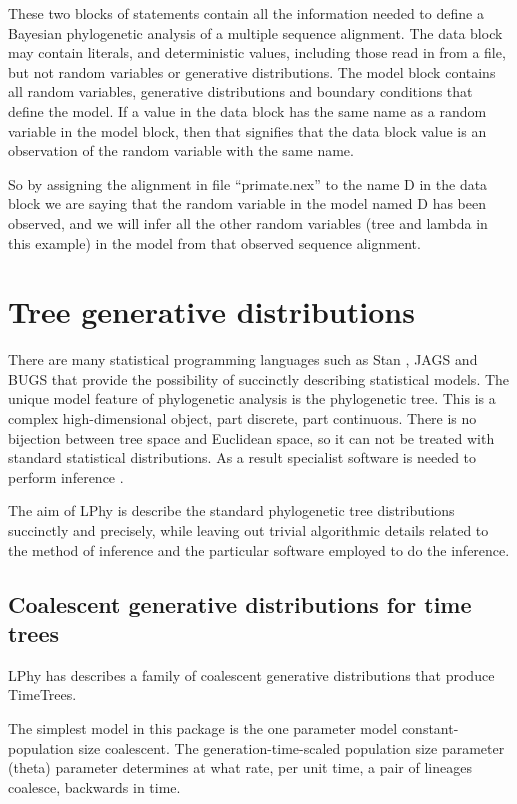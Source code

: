 \documentclass[oneside]{article}
\begin{document}
These two blocks of statements contain all the information needed to define
a Bayesian phylogenetic analysis of a multiple sequence alignment. 
The data block may contain literals, and deterministic values, including those read in from a file, but not random variables or generative distributions.
The model block contains all random variables, generative distributions and boundary conditions that define the model.
If a value in the data block has the same name as a random variable in the model block, then that signifies that the data block value is an observation of the random variable with the same name.


So by assigning the alignment in file
``primate.nex'' to the name D in the data block we are saying that the random variable in the model named D has 
been observed, and we will infer all the other random variables 
(tree and lambda in this example) in the model from that observed sequence alignment.

\section{Tree generative distributions}

There are many statistical programming languages such as Stan
\cite{carpenter2017stan}, JAGS \cite{plummer2003jags} and BUGS \cite{lunn2009bugs, gilks1994language} that provide the possibility
of succinctly describing statistical models. The unique model feature of
phylogenetic analysis is the phylogenetic tree.
This is a complex high-dimensional object, part discrete, part
continuous.
There is no bijection between tree space and Euclidean space, so it
can not be treated with standard statistical distributions.
As a result specialist software is needed to perform inference \cite{hohna2016revbayes,bouckaert2019beastanalysis}.

The aim of LPhy is describe the standard phylogenetic tree
distributions succinctly and precisely, while leaving out trivial algorithmic details related to the method
of inference and the particular software employed to do the inference.

\subsection{Coalescent generative distributions for time trees}

LPhy has describes a family of coalescent generative distributions
that produce TimeTrees.

The simplest model in this package is the one parameter model
constant-population size coalescent.
The generation-time-scaled population size parameter (theta) parameter determines at
what rate, per unit time, a pair of lineages coalesce, backwards in time.
\end{document}
